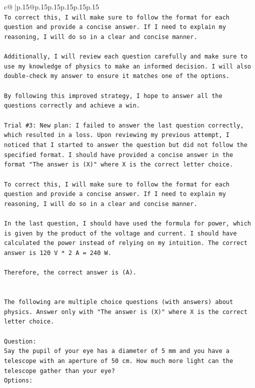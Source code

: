 \documentclass{article}
\begin{document}
{\begin{supertabular}{c@{$\;$}|p{.15\linewidth}@{}p{.15\linewidth}p{.15\linewidth}p{.15\linewidth}p{.15\linewidth}p{.15\linewidth}}
{{{\\ 
\texttt{To correct this, I will make sure to follow the format for each question and provide a concise answer. If I need to explain my reasoning, I will do so in a clear and concise manner.} \\
\\ 
\texttt{Additionally, I will review each question carefully and make sure to use my knowledge of physics to make an informed decision. I will also double{-}check my answer to ensure it matches one of the options.} \\
\\ 
\texttt{By following this improved strategy, I hope to answer all the questions correctly and achieve a win.} \\
\\ 
\texttt{Trial \#3: New plan: I failed to answer the last question correctly, which resulted in a loss. Upon reviewing my previous attempt, I noticed that I started to answer the question but did not follow the specified format. I should have provided a concise answer in the format "The answer is (X)" where X is the correct letter choice.} \\
\\ 
\texttt{To correct this, I will make sure to follow the format for each question and provide a concise answer. If I need to explain my reasoning, I will do so in a clear and concise manner.} \\
\\ 
\texttt{In the last question, I should have used the formula for power, which is given by the product of the voltage and current. I should have calculated the power instead of relying on my intuition. The correct answer is 120 V * 2 A = 240 W.} \\
\\ 
\texttt{Therefore, the correct answer is (A).} \\
\\ 
\\ 
\texttt{The following are multiple choice questions (with answers) about physics. Answer only with "The answer is (X)" where X is the correct letter choice.} \\
\\ 
\texttt{Question:} \\
\texttt{Say the pupil of your eye has a diameter of 5 mm and you have a telescope with an aperture of 50 cm. How much more light can the telescope gather than your eye?} \\
\texttt{Options:} \\
}}}
\end{supertabular}}
\end{document}
